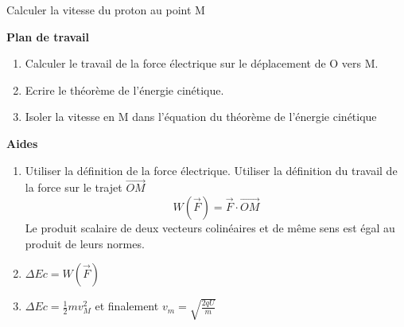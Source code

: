  Calculer la vitesse du proton au point M

\textbf{Plan de travail}
\begin{enumerate}
	\item Calculer le travail de la force électrique sur le déplacement de O vers M.
	\item Ecrire le théorème de l'énergie cinétique.
	\item Isoler la vitesse en M dans l'équation du théorème de l'énergie cinétique
\end{enumerate}

\textbf{Aides}
\begin{enumerate}
	\item 
	Utiliser la définition de la force électrique. Utiliser la définition du travail de la force sur le trajet $\vec{OM}$ $$W(\vec{F}) = \vec{F}  \cdot \overrightarrow{OM}$$ Le produit scalaire de deux vecteurs colinéaires et de même sens est égal au produit de leurs normes.
	\item $\Delta Ec = W(\vec{F})$
	\item $\Delta Ec = \frac{1}{2}mv_M^2$ et finalement $v_m= \sqrt{\frac{2qU}{m} }$
\end{enumerate}

